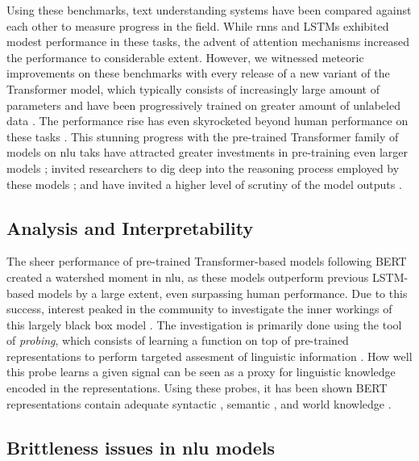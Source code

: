 \documentclass[letterpaper, 12pt]{report}
\begin{document}
Using these benchmarks, text understanding systems have been compared against each other to measure progress in the field. While \acrshort{rnn}s and LSTMs exhibited modest performance in these tasks, the advent of attention mechanisms \citep{bahdanau2014neural} increased the performance to considerable extent. However, we witnessed meteoric improvements on these benchmarks with every release of a new variant of the Transformer model, which typically consists of increasingly large amount of parameters and have been progressively trained on greater amount of unlabeled data \citep{kaplan2020scaling}. The performance rise has even skyrocketed beyond human performance on these tasks \citep[Figure~1]{kiela-etal-2021-dynabench}. This stunning progress with the pre-trained Transformer family of models on \acrshort{nlu} taks have attracted greater investments in pre-training even larger models \citep{Brown2020:GPT3, Zhang2022:OPT}; invited researchers to dig deep into the reasoning process employed by these models \citep{rogers-etal-2020-primer}; and have invited a higher level of scrutiny of the model outputs \citep{jia-liang-2017-adversarial, gururangan-etal-2018-annotation}.

\subsection{Analysis and Interpretability}

The sheer performance of pre-trained Transformer-based models following BERT created a watershed moment in \acrshort{nlu}, as these models outperform previous LSTM-based models by a large extent, even surpassing human performance. Due to this success, interest peaked in the community to investigate the inner workings of this largely black box model \citep{rogers-etal-2020-primer}. The investigation is primarily done using the tool of \textit{probing}, which consists of learning a function on top of pre-trained representations to perform targeted assesment of linguistic information \citep{hupkes2018visualisation}. How well this probe learns a given signal can be seen as a proxy for linguistic knowledge encoded in the representations. Using these probes, it has been shown BERT representations contain adequate syntactic \citep{hewitt-manning-2019-structural,jawahar-etal-2019-bert}, semantic \citep{tenney-etal-2019-bert,ettinger-2020-whatbertisnot}, and world knowledge \citep{petroni-etal-2019-language, rogers-etal-2020-primer}.

\subsection{Brittleness issues in \acrshort{nlu} models}
\end{document}
